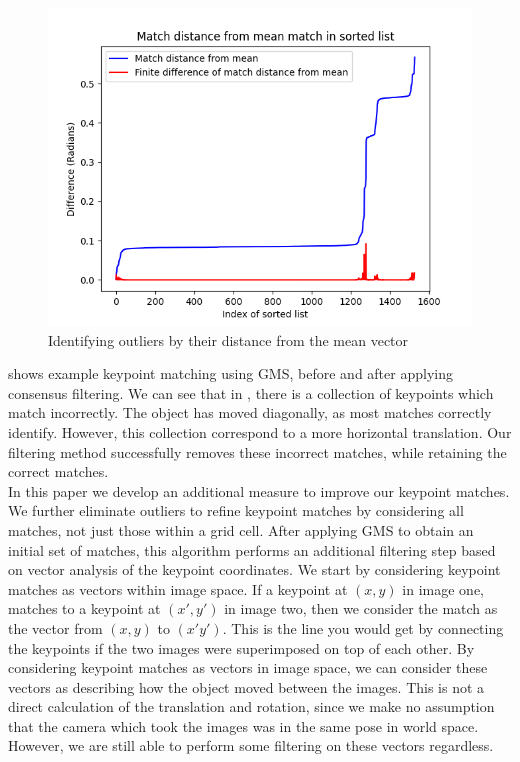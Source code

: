 \begin{figure}[h]
    \centering
    \includegraphics[width=\textwidth]{figures/bad-matches.png}
    \caption{Identifying outliers by their distance from the mean vector}
    \label{fig:bad-matches}
\end{figure}

 shows example keypoint matching using GMS, before and after applying consensus filtering. We can see that in , there is a collection of keypoints which match incorrectly. The object has moved diagonally, as most matches correctly identify. However, this collection correspond to a more horizontal translation. Our filtering method successfully removes these incorrect matches, while retaining the correct matches.\\

In this paper we develop an additional measure to improve our keypoint matches. We further eliminate outliers to refine keypoint matches by considering all matches, not just those within a grid cell. After applying GMS to obtain an initial set of matches, this algorithm performs an additional filtering step based on vector analysis of the keypoint coordinates. We start by considering keypoint matches as vectors within image space. If a keypoint at $(x,y)$ in image one, matches to a keypoint at $(x',y')$ in image two, then we consider the match as the vector from $(x,y)$ to $(x'y')$. This is the line you would get by connecting the keypoints if the two images were superimposed on top of each other. By considering keypoint matches as vectors in image space, we can consider these vectors as describing how the object moved between the images. This is not a direct calculation of the translation and rotation, since we make no assumption that the camera which took the images was in the same pose in world space. However, we are still able to perform some filtering on these vectors regardless.\\

